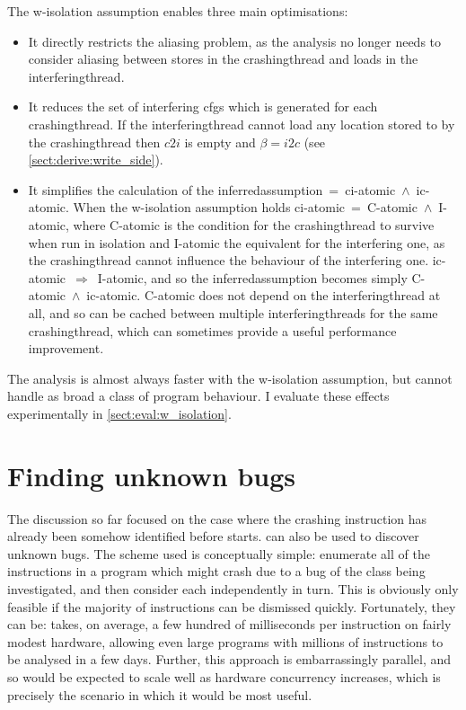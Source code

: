 The \gls{w-isolation} assumption enables three main optimisations:

\begin{itemize}
\item
  It directly restricts the aliasing problem, as the analysis no
  longer needs to consider aliasing between stores in the
  \gls{crashingthread} and loads in the \gls{interferingthread}.
\item
  It reduces the set of interfering \glspl{cfg} which is generated for
  each \gls{crashingthread}.  If the \gls{interferingthread} cannot
  load any location stored to by the \gls{crashingthread} then $c2i$
  is empty and $\beta = i2c$ (see \autoref{sect:derive:write_side}).
\item
  It simplifies the calculation of the
  \gls{inferredassumption}~=~\gls{ci-atomic}~$\wedge$~\gls{ic-atomic}.
  When the \gls{w-isolation} assumption holds
  \gls{ci-atomic}~=~C-atomic~$\wedge$~I-atomic, where C-atomic is the
  condition for the \gls{crashingthread} to survive when run in
  isolation and I-atomic the equivalent for the interfering one, as
  the \gls{crashingthread} cannot influence the behaviour of the
  interfering one.  \gls{ic-atomic}~$\Rightarrow$~I-atomic, and so the
  \gls{inferredassumption} becomes simply
  C-atomic~$\wedge$~\gls{ic-atomic}.  C-atomic does not depend on the
  \gls{interferingthread} at all, and so can be cached between
  multiple \glspl{interferingthread} for the same
  \gls{crashingthread}, which can sometimes provide a useful
  performance improvement.
\end{itemize}
The analysis is almost always faster with the \gls{w-isolation}
assumption, but cannot handle as broad a class of program behaviour.
I evaluate these effects experimentally in
\autoref{sect:eval:w_isolation}.

\section{Finding unknown bugs}
\label{sect:derive:unknown_bugs}


The discussion so far focused on the case where the crashing
instruction has already been somehow identified before {\technique}
starts.  {\Technique} can also be used to discover unknown bugs.  The
scheme used is conceptually simple: enumerate all of the instructions
in a program which might crash due to a bug of the class being
investigated, and then consider each independently in turn.  This is
obviously only feasible if the majority of instructions can be
dismissed quickly.  Fortunately, they can be: {\implementation} takes,
on average, a few hundred of milliseconds per instruction on fairly
modest hardware, allowing even large programs with millions of
instructions to be analysed in a few days.  Further, this approach is
embarrassingly parallel, and so would be expected to scale well as
hardware concurrency increases, which is precisely the scenario in
which it would be most useful.

